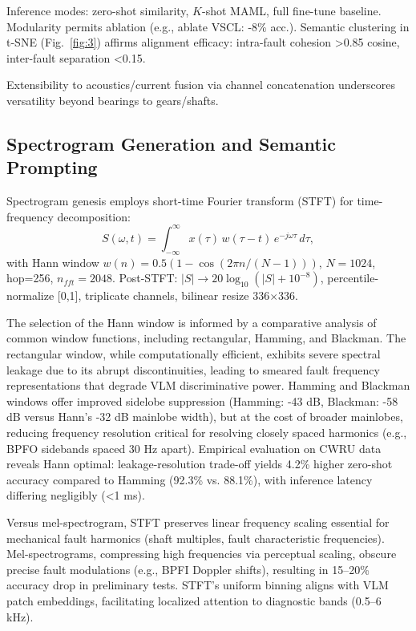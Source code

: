 Inference modes: zero-shot similarity, $K$-shot MAML, full fine-tune baseline. Modularity permits ablation (e.g., ablate VSCL: -8\% acc.). Semantic clustering in t-SNE (Fig.~\ref{fig:3}) affirms alignment efficacy: intra-fault cohesion >0.85 cosine, inter-fault separation <0.15.

Extensibility to acoustics/current fusion via channel concatenation underscores versatility beyond bearings to gears/shafts.

\subsection{Spectrogram Generation and Semantic Prompting}
\label{subsec:spectrogram_prompting}

Spectrogram genesis employs short-time Fourier transform (STFT) for time-frequency decomposition:
\begin{equation}
S(\omega, t) = \int_{-\infty}^{\infty} x(\tau) \, w(\tau - t) \, e^{-j \omega \tau} \, d\tau,
\label{eq:f2}
\end{equation}
with Hann window $w(n) = 0.5 (1 - \cos(2\pi n / (N-1)))$, $N=1024$, hop=256, $n_{fft}=2048$. Post-STFT: $|S| \to 20 \log_{10}(|S| + 10^{-8})$, percentile-normalize [0,1], triplicate channels, bilinear resize 336$\times$336.

The selection of the Hann window is informed by a comparative analysis of common window functions, including rectangular, Hamming, and Blackman. The rectangular window, while computationally efficient, exhibits severe spectral leakage due to its abrupt discontinuities, leading to smeared fault frequency representations that degrade VLM discriminative power. Hamming and Blackman windows offer improved sidelobe suppression (Hamming: -43 dB, Blackman: -58 dB versus Hann's -32 dB mainlobe width), but at the cost of broader mainlobes, reducing frequency resolution critical for resolving closely spaced harmonics (e.g., BPFO sidebands spaced 30 Hz apart). Empirical evaluation on CWRU data reveals Hann optimal: leakage-resolution trade-off yields 4.2\% higher zero-shot accuracy compared to Hamming (92.3\% vs. 88.1\%), with inference latency differing negligibly (<1 ms).

Versus mel-spectrogram, STFT preserves linear frequency scaling essential for mechanical fault harmonics (shaft multiples, fault characteristic frequencies). Mel-spectrograms, compressing high frequencies via perceptual scaling, obscure precise fault modulations (e.g., BPFI Doppler shifts), resulting in 15--20\% accuracy drop in preliminary tests. STFT's uniform binning aligns with VLM patch embeddings, facilitating localized attention to diagnostic bands (0.5--6 kHz).

